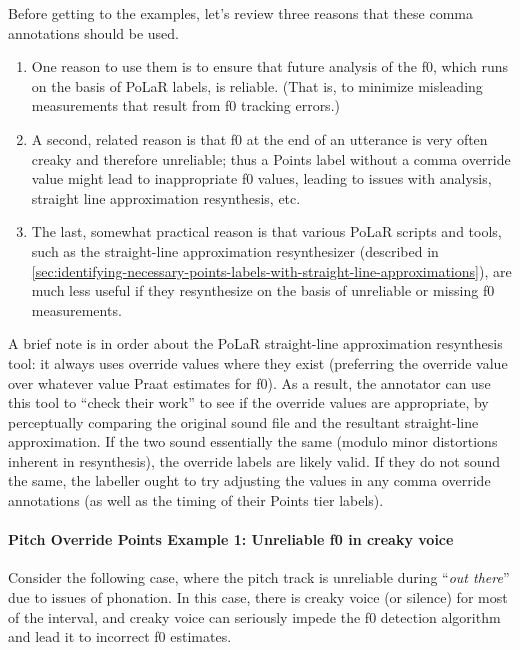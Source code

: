 \documentclass[11pt, twoside]{memoir}
\def\langtext#1{\textit{#1}}
\begin{document}
Before getting to the examples, let’s review three reasons that these comma annotations should be used.
\begin{enumerate}
	\item One reason to use them is to ensure that future analysis of the f0, which runs on the basis of PoLaR labels, is reliable. (That is, to minimize misleading measurements that result from f0 tracking errors.)
	\item A second, related reason is that f0 at the end of an utterance is very often creaky and therefore unreliable; thus a Points label without a comma override value might lead to inappropriate f0 values, leading to issues with analysis, straight line approximation resynthesis, etc.
	\item The last, somewhat practical  reason is that various PoLaR scripts and tools, such as the straight-line approximation resynthesizer (described in \ref{sec:identifying-necessary-points-labels-with-straight-line-approximations}), are much less useful if they resynthesize on the basis of unreliable or missing f0 measurements.
\end{enumerate}

A brief note is in order about the PoLaR straight-line approximation resynthesis tool: it always uses override values where they exist (preferring the override value over whatever value Praat estimates for f0). As a result, the annotator can use this tool to “check their work” to see if the override values are appropriate, by perceptually comparing the original sound file and the resultant straight-line approximation. If the two sound essentially the same (modulo minor distortions inherent in resynthesis), the override labels are likely valid. If they do not sound the same, the labeller ought to try adjusting the values in any comma override annotations (as well as the timing of their Points tier labels).

\paragraph{Pitch Override Points Example 1: Unreliable f0 in creaky voice\label{pitch-override-points-example-1}}

Consider the following case, where the pitch track is unreliable during “\langtext{out there}” due to issues of phonation. In this case, there is creaky voice (or silence) for most of the interval, and creaky voice can seriously impede the f0 detection algorithm and lead it to incorrect f0 estimates.
\end{document}
